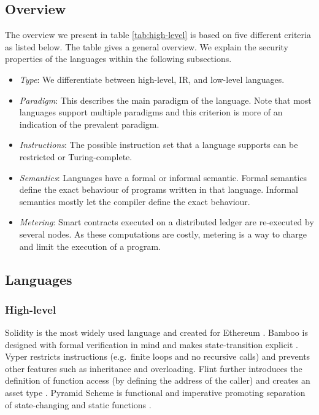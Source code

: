 \subsection{Overview}
The overview we present in table \ref{tab:high-level} is based on five different criteria as listed below. The table gives a general overview. We explain the security properties of the languages within the following subsections.
\begin{itemize}
\item \emph{Type}: We differentiate between high-level, IR, and low-level languages.
\item \emph{Paradigm}: This describes the main paradigm of the language. Note that most languages support multiple paradigms and this criterion is more of an indication of the prevalent paradigm.
\item \emph{Instructions}: The possible instruction set that a language supports can be restricted or Turing-complete.
\item \emph{Semantics}: Languages have a formal or informal semantic. Formal semantics define the exact behaviour of programs written in that language. Informal semantics mostly let the compiler define the exact behaviour.
\item \emph{Metering}: Smart contracts executed on a distributed ledger are re-executed by several nodes. As these computations are costly, metering is a way to charge and limit the execution of a program.
\end{itemize}



\subsection{Languages}

\subsubsection{High-level}
Solidity is the most widely used language and created for Ethereum \cite{Ethereum2018Solidity}.
Bamboo is designed with formal verification in mind and makes state-transition explicit \cite{Hirai2018Bamboo}. 
Vyper restricts instructions (e.g.\ finite loops and no recursive calls) and prevents other features such as inheritance and overloading\cite{Ethereum2018Vyper}. 
Flint further introduces the definition of function access (by defining the address of the caller) and creates an asset type \cite{Schrans2018}. 
Pyramid Scheme is functional and imperative promoting separation of state-changing and static functions \cite{Burge2018}.


